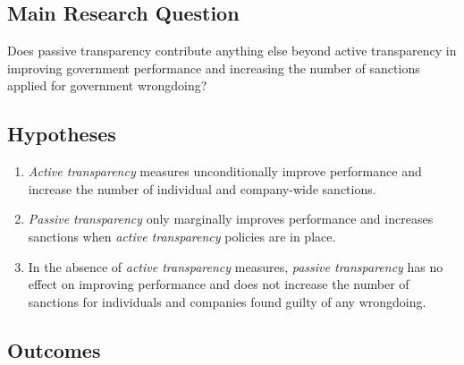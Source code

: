 \documentclass[]{article}
\begin{document}
\hypertarget{main-research-question-2}{%
\subsection{Main Research Question}\label{main-research-question-2}}

Does passive transparency contribute anything else beyond active
transparency in improving government performance and increasing the
number of sanctions applied for government wrongdoing?

\hypertarget{hypotheses-2}{%
\subsection{Hypotheses}\label{hypotheses-2}}

\begin{enumerate}
\item
  \emph{Active transparency} measures unconditionally improve
  performance and increase the number of individual and company-wide
  sanctions.
\item
  \emph{Passive transparency} only marginally improves performance and
  increases sanctions when \emph{active transparency} policies are in
  place.
\item
  In the absence of \emph{active transparency} measures, \emph{passive
  transparency} has no effect on improving performance and does not
  increase the number of sanctions for individuals and companies found
  guilty of any wrongdoing.
\end{enumerate}

\hypertarget{outcomes-2}{%
\subsection{Outcomes}\label{outcomes-2}}
\end{document}
